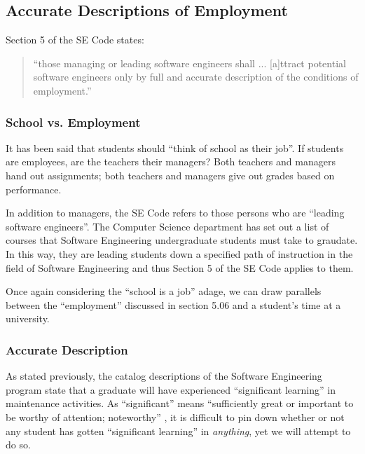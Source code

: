 \documentclass[11pt]{article}
\begin{document}
\begin{multicols}{2}
\subsection{Accurate Descriptions of Employment}

Section 5 of the SE Code states:

\begin{quote}
``those managing or leading software engineers shall ... [a]ttract potential software engineers only by full and accurate description of the conditions of employment.'' \cite{secode}
\end{quote}

\subsubsection{School vs. Employment}

It has been said that students should ``think of school as their job''. \cite{schoolJob}  If students are employees, are the teachers their managers?  Both teachers and managers hand out assignments; both teachers and managers give out grades based on performance. \cite{performanceReview}

In addition to managers, the SE Code refers to those persons who are ``leading software engineers''.  The Computer Science department has set out a list of courses that Software Engineering undergraduate students must take to graudate. \cite{catalogDegree}  In this way, they are leading students down a specified path of instruction in the field of Software Engineering and thus Section 5 of the SE Code applies to them.

Once again considering the ``school is a job'' adage, we can draw parallels between the ``employment'' discussed in section 5.06 and a student's time at a university.

\subsubsection{Accurate Description}

As stated previously, the catalog descriptions of the Software Engineering program state that a graduate will have experienced ``significant learning'' in maintenance activities. \cite{catalogDept}  As ``significant'' means ``sufficiently great or important to be worthy of attention; noteworthy'' \cite{definitionSignificant}, it is difficult to pin down whether or not any student has gotten ``significant learning'' in \emph{anything}, yet we will attempt to do so.


\end{multicols}
\end{document}
